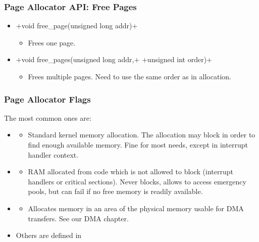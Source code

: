 \begin{frame}[fragile]
  \frametitle{Page Allocator API: Free Pages}
  \begin{itemize}
  \item {}+void free_page(unsigned long addr)+
    \begin{itemize}
    \item Frees one page.
    \end{itemize}
  \item {}+void free_pages(unsigned long addr,+
    +unsigned int order)+
    \begin{itemize}
    \item Frees multiple pages. Need to use the same order as in
      allocation.
    \end{itemize}
  \end{itemize}
\end{frame}

\begin{frame}
  \frametitle{Page Allocator Flags}
  The most common ones are:
  \begin{itemize}
  \item {}
    \begin{itemize}
    \item Standard kernel memory allocation. The allocation may
      block in order to find enough available memory. Fine for most
      needs, except in interrupt handler context.
    \end{itemize}
  \item {}
    \begin{itemize}
    \item RAM allocated from code which is not allowed to block
      (interrupt handlers or critical sections). Never blocks,
      allows to access emergency pools, but can fail if no free
      memory is readily available.
    \end{itemize}
  \item {}
    \begin{itemize}
    \item Allocates memory in an area of the physical memory usable
      for DMA transfers. See our DMA chapter.
    \end{itemize}
  \item Others are defined in 
  \end{itemize}
\end{frame}

